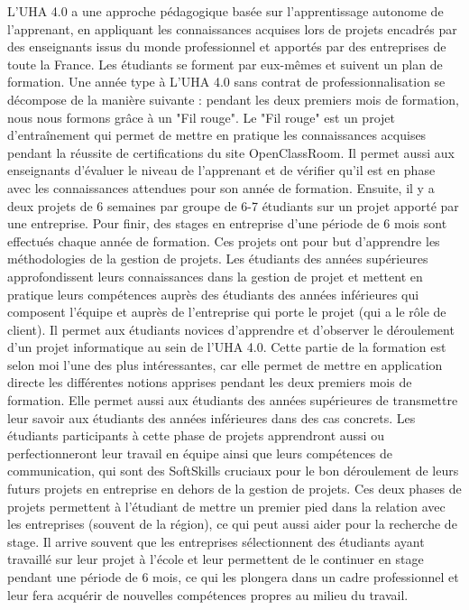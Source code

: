 \documentclass[12pt]{article}
\begin{document}
\justify
\text
L'UHA 4.0 a une approche pédagogique basée sur l'apprentissage autonome de l'apprenant, en appliquant les connaissances acquises lors de projets encadrés par des enseignants issus du monde professionnel et apportés par des entreprises de toute la France. Les étudiants se forment par eux-mêmes  et suivent un plan de formation. Une année type à L'UHA 4.0 sans contrat de professionnalisation se décompose de la manière suivante : pendant les deux premiers mois de formation, nous nous formons grâce à un "Fil rouge".
\justify
\text
Le "Fil rouge" est un projet d'entraînement qui permet de mettre en pratique les connaissances acquises pendant la réussite de certifications du site OpenClassRoom. Il permet aussi aux enseignants d'évaluer le niveau de l'apprenant et de vérifier qu'il est en phase avec les connaissances attendues pour son année de formation.
\justify
\text
Ensuite, il y a deux projets de 6 semaines par groupe de 6-7 étudiants sur un projet apporté par une entreprise. Pour finir, des stages en entreprise d'une période de 6 mois sont effectués chaque année de formation. Ces projets ont pour but d'apprendre les méthodologies de la gestion de projets. Les étudiants des années supérieures approfondissent leurs connaissances dans la gestion de projet et mettent en pratique leurs compétences auprès des étudiants des années inférieures qui composent l'équipe et auprès de l'entreprise qui porte le projet (qui a le rôle de client). Il permet aux étudiants novices d'apprendre et d'observer le déroulement d'un projet informatique au sein de l'UHA 4.0.
\justify
\text
Cette partie de la formation est selon moi l'une des plus intéressantes, car elle permet de mettre en application directe les différentes notions apprises pendant les deux premiers mois de formation. Elle permet aussi aux étudiants des années supérieures de transmettre leur savoir aux étudiants des années inférieures dans des cas concrets. Les étudiants participants à cette phase de projets apprendront aussi ou perfectionneront leur travail en équipe ainsi que leurs compétences de communication, qui sont des SoftSkills cruciaux pour le bon déroulement de leurs futurs projets en entreprise en dehors de la gestion de projets.
\justify
\text
Ces deux phases de projets permettent à l'étudiant de mettre un premier pied dans la relation avec les entreprises (souvent de la région), ce qui peut aussi aider pour la recherche de stage. Il arrive souvent que les entreprises sélectionnent des étudiants ayant travaillé sur leur projet à l'école et leur permettent de le continuer en stage pendant une période de 6 mois, ce qui les plongera dans un cadre professionnel et leur fera acquérir de nouvelles compétences propres au milieu du travail.
\end{document}
